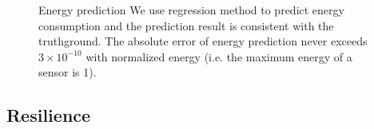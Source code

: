\begin{figure}[htbp]
	\centering
	\hspace{-0.3cm}
	\hspace{-0.2cm}
	\vspace{-0.1in}
	\caption{Energy prediction
		\textnormal{
			We use regression method to predict energy consumption and the
			prediction result is consistent with the truthground.  The absolute
			error of energy prediction never exceeds $3\times10^{-10}$ with normalized energy
			(i.e. the maximum energy of a sensor is 1).
		}
	}
	\label{fig:energy_pred}
\end{figure}

\subsection{Resilience}

